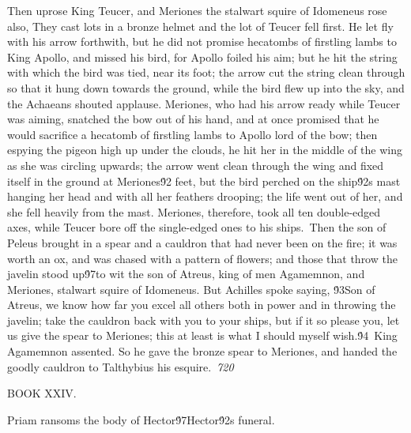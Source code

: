 {Then uprose King Teucer, and Meriones the stalwart squire of Idomeneus rose also, They cast lots in a bronze helmet and the lot of Teucer fell first. He let fly with his arrow forthwith, but he did not promise hecatombs of firstling lambs to King Apollo, and missed his bird, for Apollo foiled his aim; but he hit the string with which the bird was tied, near its foot; the arrow cut the string clean through so that it hung down towards the ground, while the bird flew up into the sky, and the Achaeans shouted applause. Meriones, who had his arrow ready while Teucer was aiming, snatched the bow out of his hand, and at once promised that he would sacrifice a hecatomb of firstling lambs to Apollo lord of the bow; then espying the pigeon high up under the clouds, he hit her in the middle of the wing as she was circling upwards; the arrow went clean through the wing and fixed itself in the ground at Meriones\'92 feet, but the bird perched on the ship\'92s mast hanging her head and with all her feathers drooping; the life went out of her, and she fell heavily from the mast. Meriones, therefore, took all ten double-edged axes, while Teucer bore off the single-edged ones to his ships.\
Then the son of Peleus brought in a spear and a cauldron that had never been on the fire; it was worth an ox, and was chased with a pattern of flowers; and those that throw the javelin stood up\'97to wit the son of Atreus, king of men Agamemnon, and Meriones, stalwart squire of Idomeneus. But Achilles spoke saying, \'93Son of Atreus, we know how far you excel all others both in power and in throwing the javelin; take the cauldron back with you to your ships, but if it so please you, let us give the spear to Meriones; this at least is what I should myself wish.\'94\
King Agamemnon assented. So he gave the bronze spear to Meriones, and handed the goodly cauldron to Talthybius his esquire.\
\pard{}\sl720\qc{}

\fs48 \cf2 BOOK XXIV.\
\pard\pardeftab720\li1710\ri1710\sa64\qj\partightenfactor0

  Priam ransoms the body of Hector\'97Hector\'92s funeral.\
\pard{}\qj{}

}
